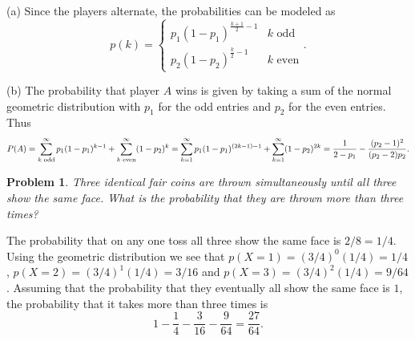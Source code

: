 \documentclass{article}
\newtheorem{problem}{Problem}
\begin{document}
(a) Since the players alternate, the probabilities can be modeled as
\[
p(k) =
\begin{cases}
p_1 (1-p_1)^{\frac{k+1}{2}-1} & \text{$k$ odd}\\
p_2 (1-p_2)^{\frac{k}{2}-1} & \text{$k$ even}
\end{cases}.
\]

(b) The probability that player $A$ wins is given by taking a sum of the normal geometric distribution with $p_1$ for the odd entries and $p_2$ for the even entries. Thus
\[
P(A) = \sum_{\textup{$k$ odd}}^{\infty} p_1 (1 - p_1)^{k - 1} + \sum_{\textup{$k$ even}}^{\infty} (1-p_2)^k = \sum_{k=1}^{\infty} p_1 (1 - p_1)^{(2k - 1) - 1} + \sum_{k=1}^{\infty} (1-p_2)^{2k} = \frac{1}{2 - p_1} - \frac{(p_2 - 1)^2}{(p_2-2)p_2}.
\]

\begin{problem}
Three identical fair coins are thrown simultaneously until all three show the same face. What is the probability that they are thrown more than three times?
\end{problem}

The probability that on any one toss all three show the same face is $2/8 = 1/4$. Using the geometric distribution we see that $p(X=1) = (3/4)^0(1/4) = 1/4$, $p(X=2) = (3/4)^1(1/4) = 3/16$ and $p(X=3) = (3/4)^2(1/4) = 9/64$. Assuming that the probability that they eventually all show the same face is $1$, the probability that it takes more than three times is
\[
1 - \frac{1}{4} - \frac{3}{16} - \frac{9}{64} = \frac{27}{64}.
\]
\end{document}
